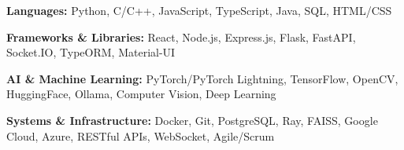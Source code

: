 \vspace{0.5mm}
\begin{cventries}

  \cvend
    {
      \begin{cvitems} %
        \item {\textbf{Languages:} Python, C/C++, JavaScript, TypeScript, Java, SQL, HTML/CSS}
        \item {\textbf{Frameworks \& Libraries:} React, Node.js, Express.js, Flask, FastAPI, Socket.IO, TypeORM, Material-UI}
        \item {\textbf{AI \& Machine Learning:} PyTorch/PyTorch Lightning, TensorFlow, OpenCV, HuggingFace, Ollama, Computer Vision, Deep Learning}
        \item {\textbf{Systems \& Infrastructure:} Docker, Git, PostgreSQL, Ray, FAISS, Google Cloud, Azure, RESTful APIs, WebSocket, Agile/Scrum}
      \end{cvitems}
    }

\end{cventries}
